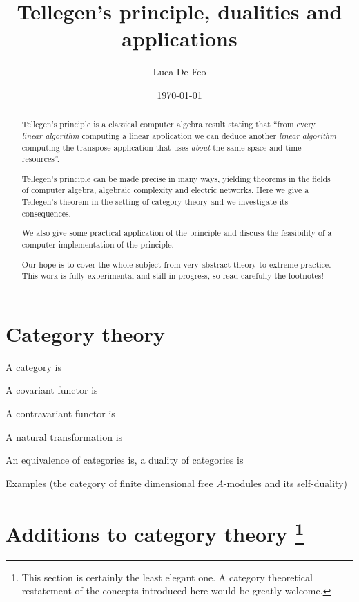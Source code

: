 \documentclass{article}
\begin{document}
  \title{Tellegen's principle, dualities and applications}
  \author{Luca De Feo}
  \date{\today}
  
  \maketitle

  \begin{abstract}
    Tellegen's principle is a classical computer algebra result
    stating that ``from every \emph{linear algorithm} computing a
    linear application we can deduce another \emph{linear algorithm}
    computing the transpose application that uses \emph{about} the
    same space and time resources''.

    Tellegen's principle can be made precise in many ways, yielding
    theorems in the fields of computer algebra, algebraic complexity
    and electric networks. Here we give a Tellegen's theorem in the
    setting of category theory and we investigate its consequences.

    We also give some practical application of the principle and
    discuss the feasibility of a computer implementation of the
    principle.

    Our hope is to cover the whole subject from very abstract theory
    to extreme practice. This work is fully experimental and still in
    progress, so read carefully the footnotes!
  \end{abstract}


  \section{Category theory}
  A category is

  A covariant functor is
  
  A contravariant functor is

  A natural transformation is

  An equivalence of categories is, a duality of categories is

  Examples (the category of finite dimensional free $A$-modules and
  its self-duality)

  
  \section{Additions to category theory
    \protect\footnote{This section is certainly the least elegant
      one. A category theoretical restatement of the concepts
      introduced here would be greatly welcome.}}
\end{document}
